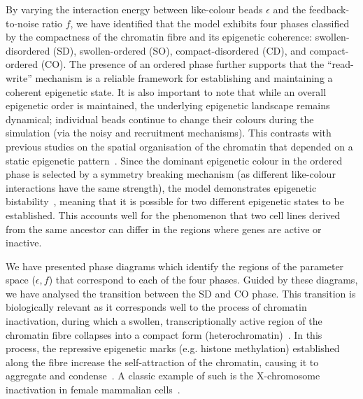 \documentclass[12pt]{article}
\begin{document}
By varying the interaction energy between like-colour beads $\epsilon$ and the feedback-to-noise ratio $f$, we have identified that the model exhibits four phases classified by the compactness of the chromatin fibre and its epigenetic coherence: swollen-disordered (SD), swollen-ordered (SO), compact-disordered (CD), and compact-ordered (CO). The presence of an ordered phase further supports that the ``read-write'' mechanism is a reliable framework for establishing and maintaining a coherent epigenetic state. It is also important to note that while an overall epigenetic order is maintained, the underlying epigenetic landscape remains dynamical; individual beads continue to change their colours during the simulation (via the noisy and recruitment mechanisms). This contrasts with previous studies on the spatial organisation of the chromatin that depended on a static epigenetic pattern~\cite{brackley2013, dixon2012, sexton2012, boettiger2016}. Since the dominant epigenetic colour in the ordered phase is selected by a symmetry breaking mechanism (as different like-colour interactions have the same strength), the model demonstrates epigenetic bistability~\cite{ferrell2012}, meaning that it is possible for two different epigenetic states to be established. This accounts well for the phenomenon that two cell lines derived from the same ancestor can differ in the regions where genes are active or inactive.

We have presented phase diagrams which identify the regions of the parameter space ($\epsilon,f$) that correspond to each of the four phases. Guided by these diagrams, we have analysed the transition between the SD and CO phase. This transition is biologically relevant as it corresponds well to the process of chromatin inactivation, during which a swollen, transcriptionally active region of the chromatin fibre collapses into a compact form (heterochromatin)~\cite{molcellbiobook}. In this process, the repressive epigenetic marks (e.g. histone methylation) established along the fibre increase the self-attraction of the chromatin, causing it to aggregate and condense~\cite{cook2002}. A classic example of such is the X-chromosome inactivation in female mammalian cells~\cite{avner2001, heard2001}. 
\end{document}
